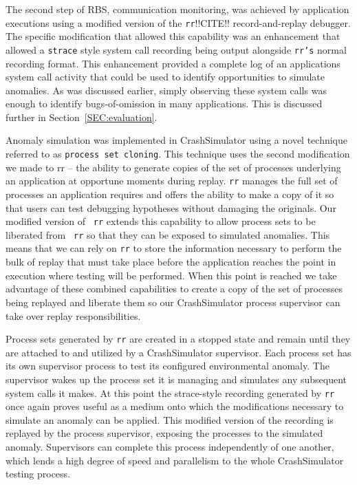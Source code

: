 The second step of RBS, communication monitoring, was achieved by
application executions using a modified version of the {\tt rr}!!CITE!!
record-and-replay debugger.  The specific modification that allowed this
capability was an enhancement that allowed  a {\tt strace} style
system call recording being output alongside {\tt rr's} normal recording
format.
This enhancement provided
a complete log of an applications system call activity
that could be used to identify opportunities to simulate anomalies.  As was
discussed earlier, simply observing these system calls was enough to
identify bugs-of-omission in many applications.  This is discussed further
in Section~\ref{SEC:evaluation}.

Anomaly simulation
was implemented in CrashSimulator
using a novel technique
referred to as {\tt process set cloning}.  This technique uses the second
modification we made to rr -- the ability to generate copies of the set of
processes underlying an application at opportune moments during replay.
{\tt rr} manages
the full set of processes an application requires and offers the ability to
make a copy of it so that users can test debugging
hypotheses without damaging the originals.  Our modified version of {\tt
rr} extends this capability to allow process sets to be liberated from {\tt
rr} so that they can be exposed to simulated anomalies.
This means that we can rely on {\tt rr}
to store the information necessary to perform the bulk of
replay that must take place before the application reaches the point in
execution where testing will be performed.  When this point is reached we
take advantage of these combined capabilities
to create a
copy of the set of processes being replayed and liberate them so our
CrashSimulator process supervisor can take over replay responsibilities.

Process sets generated by {\tt rr} are created in a stopped state and
remain until they are attached to and utilized by a CrashSimulator
supervisor.  Each process set has its own supervisor process to test
its configured environmental anomaly.  The
supervisor wakes up the process set it is managing and simulates any
subsequent system calls it makes.
At this point the strace-style recording generated by {\tt rr} once again
proves useful as a medium onto which the modifications necessary to
simulate an anomaly can be applied.  This modified version of the recording
is replayed by the process supervisor, exposing the processes to the
simulated anomaly.
Supervisors can complete this
process independently of one another, which lends a
high degree of speed and
parallelism to the whole CrashSimulator testing process.

